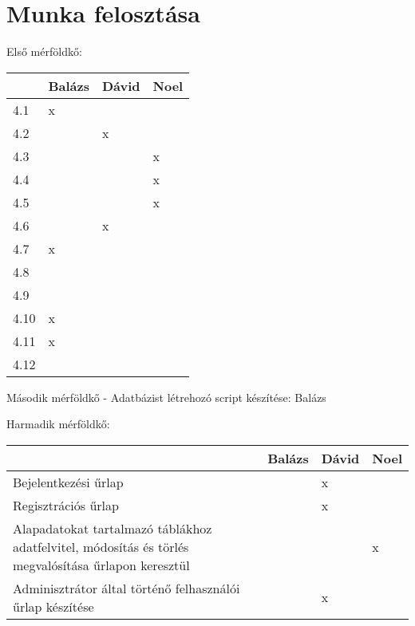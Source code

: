 \section{Munka felosztása}\label{sec:munka-felosztasa}

Első mérföldkő:


\begin{tabular}{ |p{3cm}|p{3cm}|p{3cm}|p{3cm}|  }
    \hline
    &Balázs & Dávid & Noel \\
    \hline
    4.1&x&& \\
    \hline
    4.2&&x& \\
    \hline
    4.3&&&x \\
    \hline
    4.4&&&x \\
    \hline
    4.5&&&x \\
    \hline
    4.6&&x& \\
    \hline
    4.7&x&& \\
    \hline
    4.8&&& \\
    \hline
    4.9&&& \\
    \hline
    4.10&x&& \\
    \hline
    4.11&x&& \\
    \hline
    4.12&&& \\
    \hline
\end{tabular}


Második mérföldkő - Adatbázist létrehozó script készítése: Balázs

Harmadik mérföldkő:
\begin{tabular}{ |p{3cm}|p{3cm}|p{3cm}|p{3cm}|  }
    \hline
    &Balázs & Dávid & Noel \\
    \hline
    Bejelentkezési űrlap&&x& \\
    \hline
    Regisztrációs űrlap&&x& \\
    \hline
    Alapadatokat tartalmazó táblákhoz adatfelvitel, módosítás és törlés megvalósítása űrlapon
keresztül&&&x \\
    \hline
    Adminisztrátor által történő felhasználói űrlap készítése&&x& \\
    \hline
\end{tabular}